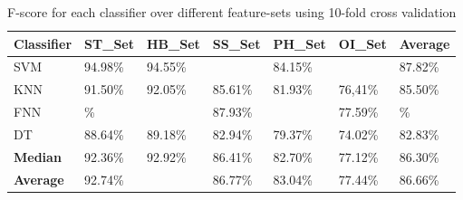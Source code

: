 \documentclass[journal,article,submit,moreauthors,pdftex]{Definitions/mdpi}
\begin{document}
\begin{table}[H]
	\caption{F-score for each classifier over different feature-sets using 10-fold cross validation }
	\centering
	\begin{tabular}{p{2cm}p{1.7cm}p{1.7cm}p{1.7cm}p{1.7cm}p{1.7cm}p{1.7cm}}
		\toprule
		\textbf{Classifier} & \textbf{ST\_Set} & \textbf{HB\_Set} & \textbf{SS\_Set} & \textbf{PH\_Set} & \textbf{OI\_Set} & Average \\
		\midrule
		SVM &  94.98\% & 94.55\% &\cellcolor{gray!35}{89.18\%} &84.15\% & \cellcolor{gray!35}{78.47\%} &87.82\%\\
		KNN & 91.50\% & 92.05\% & 85.61\% &81.93\% & 76,41\%& 85.50\% \\
		FNN & \cellcolor{gray!35}{95.31}\% & \cellcolor{gray!35}{95.89\%} &  87.93\% &\cellcolor{gray!35}{85.34\%} & 77.59\% & \cellcolor{gray!35}{89.04}\%\\
		DT & 88.64\% & 89.18\% &  82.94\% &79.37\% & 74.02\% &82.83\%\\
		\bottomrule
		\textbf{Median} & 92.36\% &  92.92\% &86.41\% & 82.70\% & 77.12\%&86.30\%\\
		\midrule
		\textbf{Average} & 92.74\% &  \cellcolor{gray!35}{93.30\%}  & 86.77\% &83.04\% & 77.44\% &86.66\%\\
		\bottomrule
	\end{tabular}
	\label{f1_classifier_featureset}
\end{table}
\end{document}
